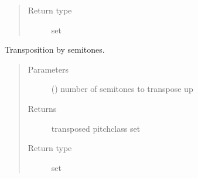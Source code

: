 \documentclass[letterpaper,10pt,english]{sphinxmanual}
\begin{document}
\begin{fulllineitems}
\begin{fulllineitems}
\begin{quote}
\begin{description}
\item[{Return type}] \leavevmode
set

\end{description}\end{quote}

\end{fulllineitems}



\begin{fulllineitems}
Transposition by  semitones.
\begin{quote}\begin{description}
\item[{Parameters}] \leavevmode
{} () \textendash{} number of semitones to transpose up

\item[{Returns}] \leavevmode
transposed pitch\sphinxhyphen{}class set

\item[{Return type}] \leavevmode
set

\end{description}\end{quote}

\end{fulllineitems}


\end{fulllineitems}
\end{document}
